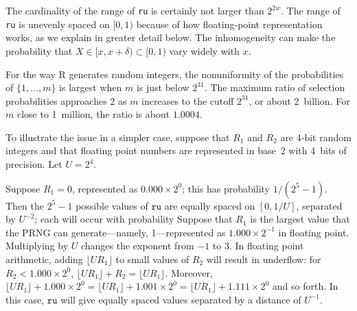 \documentclass[12pt]{article}
\newcommand{\todo}[1]{{\color{red}{TO DO: \sc #1}}}
\begin{document}
The cardinality of the range of \texttt{ru} is certainly not larger than $2^{2w}$.
The range of \texttt{ru} is unevenly spaced on $[0, 1)$
because of how floating-point representation works, as we explain in greater detail
below.
The inhomogeneity can make the probability that $X \in [x, x+\delta) \subset [0, 1)$
vary widely with $x$.

For the way R generates random integers, the nonuniformity of the probabilities of 
$\{1, \ldots, m\}$ is largest when $m$ is just below $2^{31}$. 
The maximum ratio of selection probabilities approaches $2$ as $m$ increases to the cutoff $2^{31}$, or about 2~billion. 
For $m$ close to 1~million, the ratio is about $1.0004$.

To illustrate the issue in a simpler case, suppose that $R_1$ and $R_2$ are 4-bit random
integers and that floating point numbers 
are represented in base~2 with 4~bits of precision.
Let $U=2^4$.

Suppose $R_1 = 0$, represented as $0.000 \times 2^0$; this has probability $1/(2^5-1)$.
Then the $2^5-1$ possible values of $\texttt{ru}$ are equally spaced on $[0, 1/U]$, separated by $U^{-2}$;
each will occur with probability
Suppose that $R_1$ is the largest value that the PRNG can generate---namely, 1---represented as $1.000 \times 2^{-1}$ in floating point.
Multiplying by $U$ changes the exponent from $-1$ to $3$.
In floating point arithmetic, adding $\lfloor U R_1 \rfloor$ to small values of $R_2$ will result in underflow:
for $R_2 < 1.000 \times 2^{0}$, $\lfloor U R_1 \rfloor + R_2 = \lfloor U R_1 \rfloor$. 
Moreover, $\lfloor U R_1 \rfloor + 1.000 \times 2^{0} = \lfloor U R_1 \rfloor + 1.001 \times 2^{0} = \lfloor U R_1 \rfloor + 1.111 \times 2^{0}$ and so forth.
In this case, $\texttt{ru}$ will give equally spaced values separated by a distance of $ U^{-1}$.
\todo{PBS. The way R does it, there won't be ``complete'' underflow unless $R_2$ is sufficiently small.
There are 53 bits available to store what was originally 64 bits of information, but the conversion to
floating point to produce each rand changes things, too.
The fact that the possible values don't have equal probabilities doesn't directly translate into the uniformity/non-uniformity of the distribution on $[0, 1)$, because the spacing is non-uniform, too. 
I think we need to work through one example carefully.
The probability from the ``underflow'' bits will accumulate in the more significant bits. It isn't obvious to me how all this flows down to the uniformity of the resulting distribution, measured, e.g., by the probability of an interval of width $\Delta$. }
\end{document}

